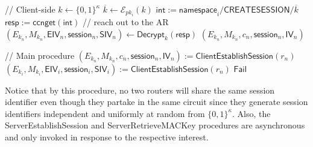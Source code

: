 \documentclass[10pt]{article}
\begin{document}
\begin{algorithm}[ht!]
\begin{algorithmic}[1]
\EndFunction

 // Client-side
  \State $k \gets \{0,1\}^{\kappa}$
  \State $\overline{k} \gets \mathcal{E}_{pk_i}(k)$
  \State $\mathsf{int} := \mathsf{namespace}_i/\mathsf{CREATESESSION}/\overline{k}$
  \State $\mathsf{resp} := \mathsf{ccnget}(\mathsf{int})$ // reach out to the AR
  \State $(E_{k_n}, M_{k_n}, \mathsf{EIV}_n, \mathsf{session}_n, \mathsf{SIV}_n) \gets \mathsf{Decrypt}_{k}(\mathsf{resp})$
  \State \Return $(E_{k_n}, M_{k_n}, c_n, \mathsf{session}_n, \mathsf{IV}_n)$
\EndFunction


 // Main procedure
\State $(E_{k_n}, M_{k_n}, c_n, \mathsf{session}_n, \mathsf{IV}_n) := \mathsf{ClientEstablishSession}(r_n)$
  \State $(E_{k_i}, M_{k_i}, \mathsf{EIV}_i, \mathsf{session}_i, \mathsf{SIV}_i) := \mathsf{ClientEstablishSession}(r_n)$
    \State \Return $\mathsf{Fail}$
  \EndIf
\EndFor
\EndFunction

  \end{algorithmic}
\end{algorithm}

Notice that by this procedure, no two routers will share the same session identifier even though they partake in the same circuit since they generate session identifiers independent and uniformly at random from $\{0,1\}^{\kappa}$. Also, the {\sf ServerEstablishSession} and {\sf ServerRetrieveMACKey} procedures are asynchronous and only invoked in response to the respective interest.
\end{document}
